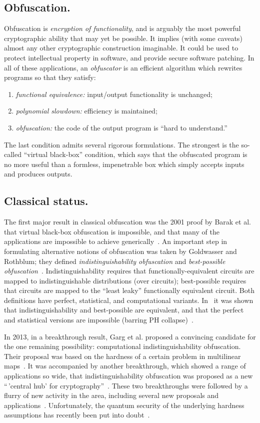 \documentclass[11pt]{amsart}
\numberwithin{equation}{section}
\begin{document}
\subsection{Obfuscation.} Obfuscation is \emph{encryption of functionality}, and is arguably the most powerful cryptographic ability that may yet be possible. It implies (with some caveats) almost any other cryptographic construction imaginable. It could be used to protect intellectual property in software, and provide secure software patching. In all of these applications, an \emph{obfuscator} is an efficient algorithm which rewrites programs so that they satisfy:
\begin{enumerate}\label{def:obf-informal}
\item \emph{functional equivalence:} input/output functionality is unchanged;
\item \emph{polynomial slowdown:} efficiency is maintained;
\item \emph{obfuscation:} the code of the output program is ``hard to understand.''
\end{enumerate}
The last condition admits several rigorous formulations. The strongest is the so-called ``virtual black-box'' condition, which says that the obfuscated program is no more useful than a formless, impenetrable box which simply accepts inputs and produces outputs. 

\subsection{Classical status.} The first major result in classical obfuscation was the 2001 proof by Barak et al. that virtual black-box obfuscation is impossible, and that many of the applications are impossible to achieve generically~\cite{BGIRSVY01, BGIRSVY12}. An important step in formulating alternative notions of obfuscation was taken by Goldwasser and Rothblum; they defined \emph{indistinguishability obfuscation} and \emph{best-possible obfuscation}~\cite{GR07}. Indistinguishability requires that functionally-equivalent circuits are mapped to indistinguishable distributions (over circuits); best-possible requires that circuits are mapped to the ``least leaky'' functionally equivalent circuit. Both definitions have perfect, statistical, and computational variants. In~\cite{GR07} it was shown that indistinguishability and best-possible are equivalent, and that the perfect and statistical versions are impossible (barring PH collapse)~\cite{GR07}. 

In 2013, in a breakthrough result, Garg et al. proposed a convincing candidate for the one remaining possibility: computational indistinguishability obfuscation. Their proposal was based on the hardness of a certain problem in multilinear maps~\cite{GGHRSW13}. It was accompanied by another breakthrough, which showed a range of applications so wide, that indistinguishability obfuscation was proposed as a new ``\,'central hub' for cryptography''~\cite{SW14}. These two breakthroughs were followed by a flurry of new activity in the area, including several new proposals and applications~\cite{BGKPS14, BCCGKPR14, BZ14, BR14, GGHW14, HSW14}. Unfortunately, the quantum security of the underlying hardness assumptions has recently been put into doubt~\cite{Pei15}.
\end{document}
